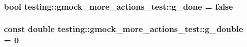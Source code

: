 \subsubsection[{\texorpdfstring{g\+\_\+done}{g_done}}]{\setlength{\rightskip}{0pt plus 5cm}bool testing\+::gmock\+\_\+more\+\_\+actions\+\_\+test\+::g\+\_\+done = false}\hypertarget{namespacetesting_1_1gmock__more__actions__test_ab2d168581c62c89bd00cdadcccd9e8e4}{}\label{namespacetesting_1_1gmock__more__actions__test_ab2d168581c62c89bd00cdadcccd9e8e4}
\subsubsection[{\texorpdfstring{g\+\_\+double}{g_double}}]{\setlength{\rightskip}{0pt plus 5cm}const double testing\+::gmock\+\_\+more\+\_\+actions\+\_\+test\+::g\+\_\+double = 0}\hypertarget{namespacetesting_1_1gmock__more__actions__test_a73552112032ff5d5900dd6f128a62718}{}\label{namespacetesting_1_1gmock__more__actions__test_a73552112032ff5d5900dd6f128a62718}
